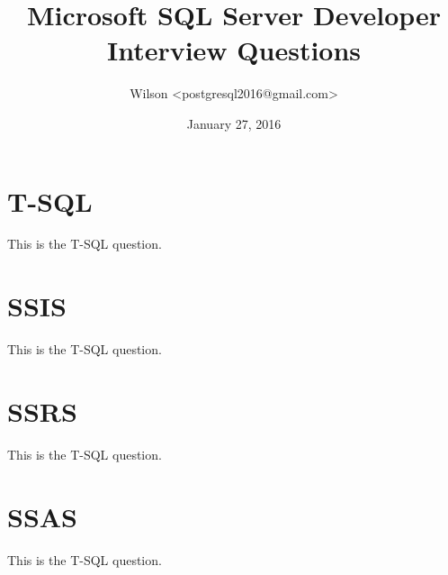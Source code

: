 \documentclass[a4paper,11pt]{article}
\begin{document}
\title{Microsoft SQL Server Developer Interview Questions}
\author{Wilson <postgresql2016@gmail.com>}
\date{January 27, 2016}
\maketitle
\section{T-SQL}
This is the T-SQL question.

\section{SSIS}
This is the T-SQL question.
\section{SSRS}
This is the T-SQL question.
\section{SSAS}
This is the T-SQL question.
\end{document}
